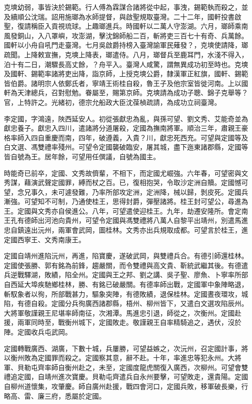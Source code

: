 \begin{pinyinscope}
克塽幼弱，事皆決於錫範。行人傅為霖謀合諸將從中起，事洩，錫範執而殺之，並及續順公沈瑞。詔用施瑯為水師提督，與啟聖規取臺灣。二十二年，國軒投書啟聖，復請稱臣入貢視琉球。上趣瑯進兵。時國軒以二萬人守澎湖。六月，瑯師乘南風發銅山，入八罩嶼，攻澎湖，擊沈錦師船二百，斬將吏三百七十有奇、兵萬餘。國軒以小舟自吼門走臺灣。七月吳啟爵持榜入臺灣諭軍民薙發？，克塽使請降，瑯疏聞。上降敕宣撫，克塽上降表，瑯遣侍。八月，瑯督兵至鹿耳門，水淺不得入，泊十有二日，潮驟長高丈餘，？舟平入。臺灣人咸驚，謂無異成功初至時也。克塽及國軒、錫範率諸將吏出降，詣京師，上授克塽公爵，隸漢軍正紅旗，國軒、錫範皆伯爵。諸明宗人依鄭氏者，寧靖王術桂自殺，魯王子及他宗室皆徙河南。上以國軒為天津總兵，召對慰勉。眷屬至，賜第京師。克塽請為成功子聰、錦子克舉等？官，上特許之。光緒初，德宗允船政大臣沈葆楨疏請，為成功立祠臺灣。

李定國，字鴻遠，陜西延安人。初從張獻忠為亂，與孫可望、劉文秀、艾能奇並為獻忠養子。獻忠入四川，遣諸將分道屠殺，定國為撫南將軍。順治三年，肅親王豪格率師入四自重慶而南，四年，破遵義，入貴？川，獻忠死西充。可望與定國等及白文選、馮雙禮率殘州。可望令定國襲破臨安，屠其城，盡下迤東諸郡縣，定國等皆自號為王。居年餘，可望用任僎議，自號為國主。

時能奇已前卒，定國、文秀故儕輩，不相下，而定國尤崛強。六年春，可望密與文秀謀，藉演武聲定國罪，縛而杖之百。已，復相抱哭，令取沙定洲自贖。定國憾可望，念兄事久，未可遽發難，乃率所部攻定洲，定洲降，械以歸，剝皮死。定國兵漸強。可望知不可制，乃通使桂王，思得封爵，彈壓諸將。桂王封可望公，尋進為王。定國與文秀亦自侯進公。八年，可望遣使迎桂王。九年，劫遷安隆所。會定南王孔有德師出河池向貴州，可望令定國與馮雙禮將八萬人自黎平出靖州，別遣馬進忠自鎮遠出沅州，兩軍會武岡，圖桂林。文秀亦出兵規取成都。可望言於桂王，進定國西寧王、文秀南康王。

定國自靖州進陷沅州，再進，陷寶慶，遂破武岡，與雙禮兵合。有德引師還桂林。定國使張勝、郭有銘為前鋒，趨嚴關，而令雙禮與高文貴、靳統武繼其後。有德遣兵逆戰驛湖，敗績，陷全州。定國與王之邦、劉之講、吳子聖、廖魚、卜寧率所部自西延大埠疾馳鄉桂林，勝、有銘已破嚴關。有德率師出戰，定國軍中象陣略退，斬馭象者以徇，所部戰甚力，驅象突陣，有德敗績，退保桂林。定國晝夜環攻，城陷，有德自殺。定國分兵徇廣西諸郡縣，梧州、柳州皆下，又遣白文選攻陷辰州。大將軍敬謹親王尼堪率師南征，次湘潭。馬進忠引退，師從之，次衡州。定國赴援，兩軍同時至，戰衡州城下，定國敗走。敬謹親王自率精騎追之，遇伏，沒於陣。定國收兵屯武岡。

定國轉戰廣西、湖廣，下數十城，兵屢勝，可望益嫉之，次沅州，召定國計事，將以衡州敗為定國罪而殺之。定國察其意，辭不赴。十年，率進忠等犯永州。大將軍、貝勒屯齊率師自衡州赴之，未至，定國度龍虎關復入廣西，次柳州。可望會雙禮追定國，自靖州進次寶慶。貝勒屯齊遣兵自永州要擊，可望敗走，還貴陽。定國自柳州道懷集，攻肇慶。師自廣州赴援，戰四會河口，定國兵敗，移軍破長樂，行略高、雷、廉三府，悉屬於定國。


\end{pinyinscope}
